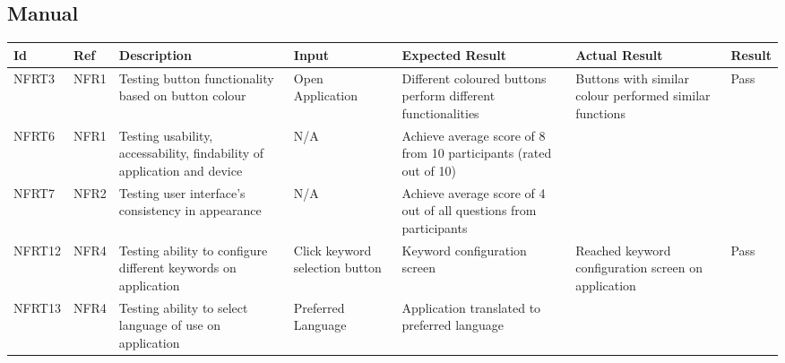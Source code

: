 \documentclass[12pt, titlepage]{article}
\begin{document}
\subsection{Manual}
\begin{longtable}{|p{1.4cm}|p{1cm}|p{3cm}|p{1.5cm}|p{2.5cm}|p{2cm}|p{1.2cm}|}
  \hline
  \textbf{Id} & \textbf{Ref} & \textbf{Description}                                                         & \textbf{Input}                                    & \textbf{Expected Result}                                    & \textbf{Actual Result} & \textbf{Result}                                    \\ \hline
  NFRT3        & NFR1          & Testing button functionality based on button colour                     & Open Application                 & Different coloured buttons perform different functionalities    & Buttons with similar colour performed similar functions                        & {\color[HTML]{32CB00} Pass}                        \\ \hline
  NFRT6        & NFR1          & Testing usability, accessability, findability of application and device                     & N/A                              & Achieve average score of 8 from 10 participants (rated out of 10)                           &                       &  \cellcolor[HTML]{FFFFFF}{\color[HTML]{F8A102} TBD}                       \\ \hline
  NFRT7        & NFR2          & Testing user interface's consistency in appearance                     & N/A                              & Achieve average score of 4 out of all questions from participants                       &                        & \cellcolor[HTML]{FFFFFF}{\color[HTML]{F8A102} TBD} \\ \hline
  NFRT12        & NFR4         & Testing ability to configure different keywords on application                    & Click keyword selection button   & Keyword configuration screen                                                   & Reached keyword configuration screen on application                     & {\color[HTML]{32CB00} Pass}                                                    \\ \hline
  NFRT13        & NFR4         & Testing ability to select language of use on application                  & Preferred Language               & Application translated to preferred language                  &                        &           \cellcolor[HTML]{FFFFFF}{\color[HTML]{F8A102} TBD}                                         \\ \hline

\end{longtable}
\end{document}
